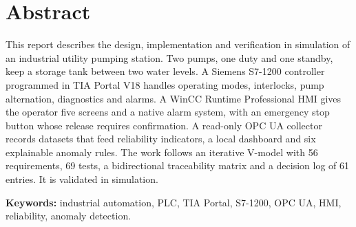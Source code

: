 \documentclass[11pt,a4paper]{report}
\newcommand{\frontsection}[1]{\chapter*{#1}}
\begin{document}
	\frontsection{Abstract}
	This report describes the design, implementation and verification in simulation of an industrial utility pumping station. Two pumps, one duty and one standby, keep a storage tank between two water levels. A Siemens S7-1200 controller programmed in TIA Portal V18 handles operating modes, interlocks, pump alternation, diagnostics and alarms. A WinCC Runtime Professional HMI gives the operator five screens and a native alarm system, with an emergency stop button whose release requires confirmation. A read-only OPC UA collector records datasets that feed reliability indicators, a local dashboard and six explainable anomaly rules. The work follows an iterative V-model with 56 requirements, 69 tests, a bidirectional traceability matrix and a decision log of 61 entries. It is validated in simulation.
	
	\medskip\noindent\textbf{Keywords:} industrial automation, PLC, TIA Portal, S7-1200, OPC UA, HMI, reliability, anomaly detection.
	
	\clearpage
	\tableofcontents
	
	\listoffigures
	
	\listoftables
	
	
\end{document}
